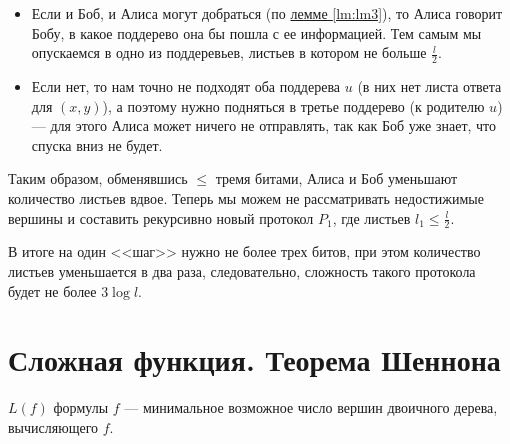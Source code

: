 \begin{proof*}
\begin{itemize}
			\begin{itemize}
				\item Если и Боб, и Алиса могут добраться (по \hyperref[lm:lm3]{лемме \ref{lm:lm3}}), то Алиса говорит Бобу, в какое поддерево она бы пошла с ее информацией. Тем самым мы опускаемся в одно из поддеревьев, листьев в котором не больше $ \frac{l}{2}$.
				\item Если нет, то нам точно не подходят оба поддерева $ u$ (в них нет листа ответа для $ (x, y)$), а поэтому нужно подняться в третье поддерево (к родителю  $ u$) --- для этого Алиса может ничего не отправлять, так как Боб уже знает, что спуска вниз не будет.
			\end{itemize}
			Таким образом, обменявшись $ \le$ тремя битами, Алиса и Боб уменьшают количество листьев вдвое. Теперь мы можем не рассматривать недостижимые вершины и составить рекурсивно новый протокол $  P_1$, где листьев $ l_1 \le \frac{l}{2}$. 

			В итоге на один <<шаг>> нужно не более трех битов, при этом количество листьев уменьшается в два раза, следовательно, сложность такого протокола будет не более $ 3 \log l$.
	\end{itemize}
\end{proof*}


\section{Сложная функция. Теорема Шеннона}

\begin{defn}
	 $ L(f)$ формулы  $ f$ --- минимальное возможное число вершин двоичного дерева, вычисляющего  $ f$.
\end{defn}

